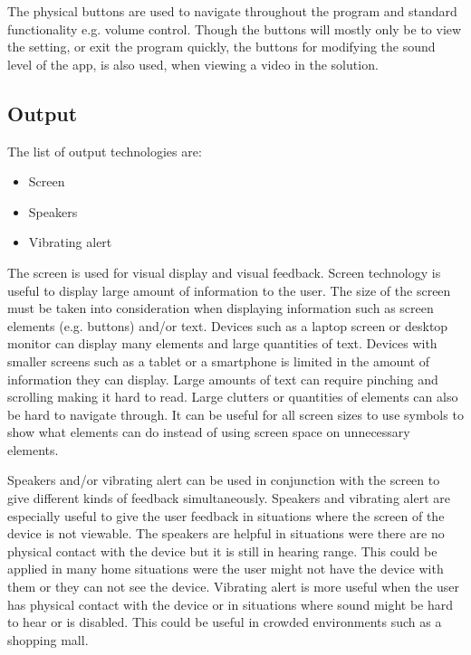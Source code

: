 
The physical buttons are used to navigate throughout the program and standard functionality e.g. volume control. Though the buttons will mostly only be to view the setting, or exit the program quickly, the buttons for modifying the sound level of the app, is also used, when viewing a video in the solution.

\subsection{Output}
The list of output technologies are:

\begin{itemize}
    \item Screen
    \item Speakers
    \item Vibrating alert
\end{itemize}

The screen is used for visual display and visual feedback. Screen technology is useful to display large amount of information to the user. The size of the screen must be taken into consideration when displaying information such as screen elements (e.g. buttons) and/or text. Devices such as a laptop screen or desktop monitor can display many elements and large quantities of text. Devices with smaller screens such as a tablet or a smartphone is limited in the amount of information they can display. Large amounts of text can require pinching and scrolling making it hard to read. Large clutters or quantities of elements can also be hard to navigate through. It can be useful for all screen sizes to use symbols to show what elements can do instead of using screen space on unnecessary elements.            

Speakers and/or vibrating alert can be used in conjunction with the screen to give different kinds of feedback simultaneously. Speakers and vibrating alert are especially useful to give the user feedback in situations where the screen of the device is not viewable. The speakers are helpful in situations were there are no physical contact with the device but it is still in hearing range. This could be applied in many home situations were the user might not have the device with them or they can not see the device. Vibrating alert is more useful when the user has physical contact with the device or in situations where sound might be hard to hear or is disabled. This could be useful in crowded environments such as a shopping mall.     

